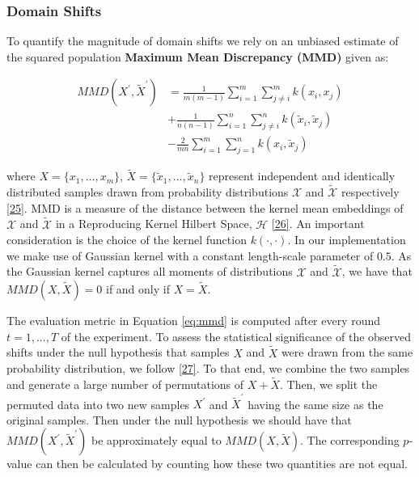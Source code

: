 \documentclass[conference,final,]{IEEEtran}
\theoremstyle{definition}
\theoremstyle{definition}
\theoremstyle{definition}
\theoremstyle{definition}
\theoremstyle{remark}
\begin{document}
\hypertarget{domain-shifts}{%
\subsubsection{Domain Shifts}\label{domain-shifts}}

To quantify the magnitude of domain shifts we rely on an unbiased estimate of the squared population \textbf{Maximum Mean Discrepancy (MMD)} given as:

\begin{equation}
\begin{aligned}
MMD({X}^\prime,\tilde{X}^\prime) &= \frac{1}{m(m-1)}\sum_{i=1}^m\sum_{j\neq i}^m k(x_i,x_j) \\ &+ \frac{1}{n(n-1)}\sum_{i=1}^n\sum_{j\neq i}^n k(\tilde{x}_i,\tilde{x}_j) \\ &- \frac{2}{mn}\sum_{i=1}^m\sum_{j=1}^n k(x_i,\tilde{x}_j) \label{eq:mmd}
\end{aligned}
\end{equation}

where \(X=\{x_1,...,x_m\}\), \(\tilde{X}=\{\tilde{x}_1,...,\tilde{x}_n\}\) represent independent and identically distributed samples drawn from probability distributions \(\mathcal{X}\) and \(\mathcal{\tilde{X}}\) respectively \protect\hyperlink{ref-gretton2012kernel}{{[}25{]}}. MMD is a measure of the distance between the kernel mean embeddings of \(\mathcal{X}\) and \(\mathcal{\tilde{X}}\) in a Reproducing Kernel Hilbert Space, \(\mathcal{H}\) \protect\hyperlink{ref-berlinet2011reproducing}{{[}26{]}}. An important consideration is the choice of the kernel function \(k(\cdot,\cdot)\). In our implementation we make use of Gaussian kernel with a constant length-scale parameter of \(0.5\). As the Gaussian kernel captures all moments of distributions \(\mathcal{X}\) and \(\mathcal{\tilde{X}}\), we have that \(MMD(X,\tilde{X})=0\) if and only if \(X=\tilde{X}\).

The evaluation metric in Equation \eqref{eq:mmd} is computed after every round \(t=1,...,T\) of the experiment. To assess the statistical significance of the observed shifts under the null hypothesis that samples \(X\) and \(\tilde{X}\) were drawn from the same probability distribution, we follow \protect\hyperlink{ref-arcones1992bootstrap}{{[}27{]}}. To that end, we combine the two samples and generate a large number of permutations of \(X + \tilde{X}\). Then, we split the permuted data into two new samples \(X^\prime\) and \(\tilde{X}^\prime\) having the same size as the original samples. Then under the null hypothesis we should have that \(MMD(X^\prime,\tilde{X}^\prime)\) be approximately equal to \(MMD(X,\tilde{X})\). The corresponding \(p\)-value can then be calculated by counting how these two quantities are not equal.
\end{document}
